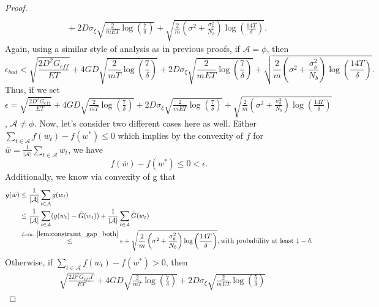 \documentclass{article} %
\def\A{{\mathcal A}}
\begin{document}
\begin{proof}
\begin{equation*}
\begin{aligned}
        \\
        &\quad 
        + 2 D \sigma_\xi \sqrt{\frac{2}{mET}\log\left(\frac{7}{\delta}\right)} 
        + \sqrt{\frac{2}{m}\left({\sigma^2} + \frac{\sigma^2_b}{N_b}\right) \log\left(\frac{14T}{\delta}\right)}.
    \end{aligned}
    \end{equation*}
    Again, using a similar style of analysis as in previous proofs, if $\A = \phi$, then
    $$\epsilon_{bad} < \sqrt{\frac{{2 D^2 G_{eff}}}{{E T}}} + 4 G D \sqrt{\frac{2}{{mT}}\log\left(\frac{7}{\delta}\right)}
        + 2 D \sigma_\xi \sqrt{\frac{2}{mET}\log\left(\frac{7}{\delta}\right)}
    + \sqrt{\frac{2}{m}\left({\sigma^2} + \frac{\sigma^2_b}{N_b}\right) \log\left(\frac{14T}{\delta}\right)}.$$
    Thus, if we set $\epsilon = \sqrt{\frac{{2 D^2 G_{eff}}}{{E T}}} +  4 G D \sqrt{\frac{2}{{mT}}\log\left(\frac{7}{\delta}\right)}
        + 2 D \sigma_\xi \sqrt{\frac{2}{mET}\log\left(\frac{7}{\delta}\right)} 
    + \sqrt{\frac{2}{m}\left({\sigma^2} + \frac{\sigma^2_b}{N_b}\right) \log\left(\frac{14T}{\delta}\right)}$, $\A \neq \phi$.
    Now, let's consider two different cases here as well. Either $\sum_{t\in \A} f(w_t)-f(w^*) \leq 0$ which implies by the convexity of $f$ for $\bar{w} = \frac{1}{|\A|} \sum_{t\in \A} w_t$, we have
    \begin{equation}
    \label{eq:fedhsgm_partial_objective_result1_1_stoch}
        f(\bar{w})-f(w^*) \leq 0 <\epsilon.
    \end{equation}
    Additionally, we know via convexity of g that
    \begin{align*}
        g(\bar{w}) &\leq \frac{1}{|\A|} \sum_{t\in \A}g(w_t)
        \\
        & \leq \frac{1}{|\A|} \sum_{t\in \A}(g(w_t) - \tilde{G}(w_t)) + \frac{1}{|\A|} \sum_{t\in \A}\tilde{G}(w_t)
        \\
        &\overset{Lem.~\ref{lem:constraint_gap_both}}{\leq} \epsilon + \sqrt{\frac{2}{m}\left({\sigma^2} + \frac{\sigma^2_b}{N_b}\right) \log\left(\frac{14T}{\delta}\right)}, \text{with probability at least } 1-\delta.
    \end{align*}
    Otherwise, if $\sum_{t\in \A} f(w_t)-f(w^*) >0$, then
    \begin{equation}
    \label{eq:fedhsgm_partial_stoch}
        \begin{aligned}
          &\sqrt{\frac{{2 D^2 G_{eff} \Gamma}}{{E T}}} + 4 G D \sqrt{\frac{2}{{mT}}\log\left(\frac{7}{\delta}\right)}
            + 2 D \sigma_\xi \sqrt{\frac{2}{mET}\log\left(\frac{5}{\delta}\right)}

\end{aligned}
\end{equation}
\end{proof}
\end{document}
